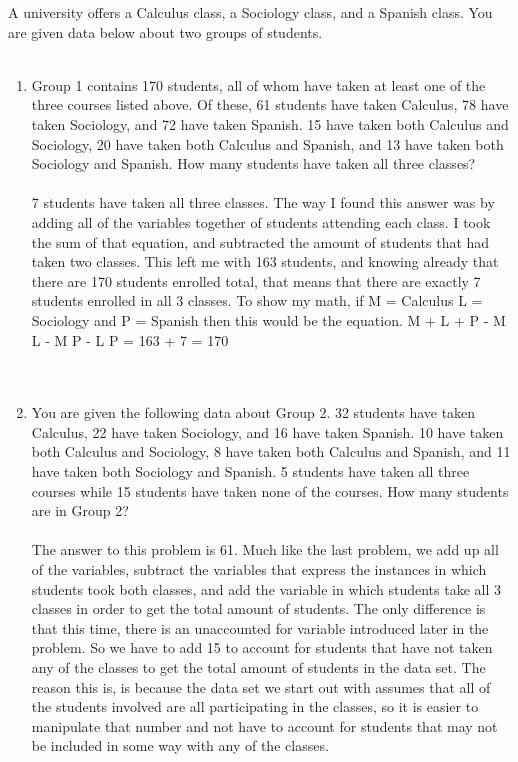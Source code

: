 A university offers a Calculus class, a Sociology class, and a Spanish class. You are given data below about two groups of students.\\\\
     \begin{enumerate}[label=(\roman*)]
     \item Group 1 contains 170 students, all of whom have taken at least one of the three courses listed above. Of these, 61 students have taken Calculus, 78 have taken Sociology, and 72 have taken Spanish. 15 have taken both Calculus and Sociology, 20 have taken both Calculus and Spanish, and 13 have taken both Sociology and Spanish. How many students have taken all three classes?\\\\
7 students have taken all three classes. The way I found this answer was by adding all of the variables together of students attending each class. I took the sum of that equation, and subtracted the amount of students that had taken two classes. This left me with 163 students, and knowing already that there are 170 students enrolled total, that means that there are exactly 7 students enrolled in all 3 classes. To show my math, if M = Calculus L = Sociology and P = Spanish then this would be the equation. M + L + P - M \cap L - M \cap P - L \cap P = 163 + 7 = 170
\\\\\
   
\item You are given the following data about Group 2. 32 students have taken Calculus, 22 have taken Sociology, and 16 have taken Spanish. 10 have taken both Calculus and Sociology, 8 have taken both Calculus and Spanish, and 11 have taken both Sociology and Spanish. 5 students have taken all three courses while 15 students have taken none of the courses. How many students are in Group 2?\\\\
The answer to this problem is 61. Much like the last problem, we add up all of the variables, subtract the variables that express the instances in which students took both classes, and add the variable in which students take all 3 classes in order to get the total amount of students. The only difference is that this time, there is an unaccounted for variable introduced later in the problem. So we have to add 15 to account for students that have not taken any of the classes to get the total amount of students in the data set. The reason this is, is because the data set we start out with assumes that all of the students involved are all participating in the classes, so it is easier to manipulate that number and not have to account for students that may not be included in some way with any of the classes.
\\\\\
         \end{enumerate}
 \newpage

